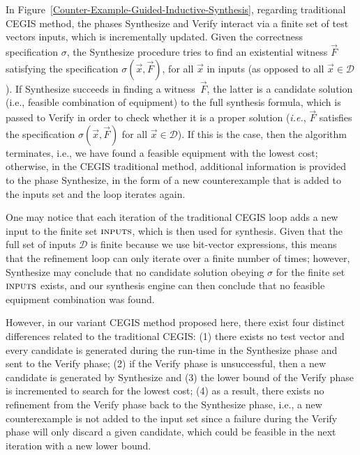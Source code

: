 \documentclass[journal]{IEEEtran}
\begin{document}
In Figure~\ref{Counter-Example-Guided-Inductive-Synthesis}, regarding traditional CEGIS method, the phases {\sc Synthesize} and {\sc Verify} interact via a finite set of test vectors {\sc inputs}, which is incrementally updated. Given the correctness specification $\sigma$, the {\sc Synthesize} procedure tries to find an existential witness $\vec{F}$ satisfying the specification $\sigma(\vec{x}, \vec{F})$, for all $\vec{x}$ in {\sc inputs} (as opposed to all $\vec{x} \in \mathcal{D}$). If {\sc Synthesize} succeeds in finding a witness~$\vec{F}$, the latter is a candidate solution (i.e., feasible combination of equipment) to the full synthesis formula, which is passed to {\sc Verify} in order to check whether it is a proper solution ({\it i.e.}, $\vec{F}$ satisfies the specification $\sigma(\vec{x}, \vec{F})$ for all $\vec{x}\in\mathcal{D}$). If this is the case, then the algorithm terminates, i.e., we have found a feasible equipment with the lowest cost; otherwise, in the CEGIS traditional method, additional information is provided to the phase {\sc Synthesize}, in the form of a new counterexample that is added to the {\sc inputs} set and the loop iterates again.

One may notice that each iteration of the traditional CEGIS loop adds a new input to the finite set $\text{\sc inputs}$, which is then used for synthesis. Given that the full set of inputs $\mathcal{D}$ is finite because we use bit-vector expressions, this means that the refinement loop can only iterate over a finite number of times; however, {\sc Synthesize} may conclude that no candidate solution obeying $\sigma$ for the finite set $\text{\sc inputs}$ exists, and our synthesis engine can then conclude that no feasible equipment combination was found.

However, in our variant CEGIS method proposed here, there exist four distinct differences related to the traditional CEGIS: 
(1) there exists no test vector and every candidate is generated during the run-time in the {\sc Synthesize} phase and sent to the {\sc Verify} phase; 
(2) if the {\sc Verify} phase is unsuccessful, then a new candidate is generated by {\sc Synthesize} and 
(3) the lower bound of the {\sc Verify} phase is incremented to search for the lowest cost; 
(4) as a result, there exists no refinement from the {\sc Verify} phase back to the {\sc Synthesize} phase, i.e., 
a new counterexample is not added to the {\sc input} set since a failure during the {\sc Verify} phase will only discard a given candidate, which could be feasible in the next iteration with a new lower bound.
\end{document}
